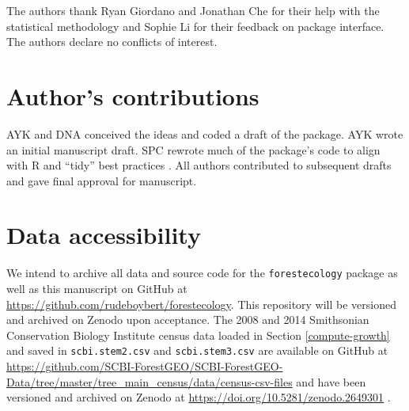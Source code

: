 \documentclass[12pt]{article}
\begin{document}
The authors thank Ryan Giordano and Jonathan Che for their help with the
statistical methodology and Sophie Li for their feedback on package
interface. The authors declare no conflicts of interest.

\hypertarget{authors-contributions}{%
\section{Author's contributions}\label{authors-contributions}}

AYK and DNA conceived the ideas and coded a draft of the package. AYK
wrote an initial manuscript draft. SPC rewrote much of the package's
code to align with R and ``tidy'' best practices
\citep{wickham_welcome_2019}. All authors contributed to subsequent
drafts and gave final approval for manuscript.

\hypertarget{data-accessibility}{%
\section{Data accessibility}\label{data-accessibility}}

We intend to archive all data and source code for the
\texttt{forestecology} package as well as this manuscript on GitHub at
\url{https://github.com/rudeboybert/forestecology}. This repository will
be versioned and archived on Zenodo upon acceptance. The 2008 and 2014
Smithsonian Conservation Biology Institute census data loaded in Section
\ref{compute-growth} and saved in \texttt{scbi.stem2.csv} and
\texttt{scbi.stem3.csv} are available on GitHub at
\url{https://github.com/SCBI-ForestGEO/SCBI-ForestGEO-Data/tree/master/tree_main_census/data/census-csv-files}
and have been versioned and archived on Zenodo at
\url{https://doi.org/10.5281/zenodo.2649301}
\citep{gonzalez-akre_scbi-forestgeoscbi-forestgeo-data_2020}.



\end{document}
